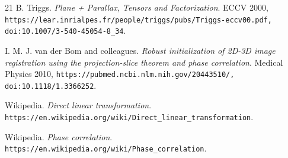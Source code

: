 \begin{thebibliography}{21}
B. Triggs. \emph{Plane + Parallax, Tensors and Factorization}. ECCV 2000, \texttt{https:/\allowbreak{}/\allowbreak{}lear.inrialpes.fr/\allowbreak{}people/\allowbreak{}triggs/\allowbreak{}pubs/\allowbreak{}Triggs-eccv00.pdf,} \texttt{doi:10.1007/\allowbreak{}3-540-45054-8\_\allowbreak{}34}.

I. M. J. van der Bom and colleagues. \emph{Robust initialization of 2D-3D image registration using the projection-slice theorem and phase correlation}. Medical Physics 2010, \texttt{https:/\allowbreak{}/\allowbreak{}pubmed.ncbi.nlm.nih.gov/\allowbreak{}20443510/\allowbreak{},} \texttt{doi:10.1118/\allowbreak{}1.3366252}.

Wikipedia. \emph{Direct linear transformation}. \texttt{https:/\allowbreak{}/\allowbreak{}en.wikipedia.org/\allowbreak{}wiki/\allowbreak{}Direct\_\allowbreak{}linear\_\allowbreak{}transformation}.

Wikipedia. \emph{Phase correlation}. \texttt{https:/\allowbreak{}/\allowbreak{}en.wikipedia.org/\allowbreak{}wiki/\allowbreak{}Phase\_\allowbreak{}correlation}.

\end{thebibliography}
